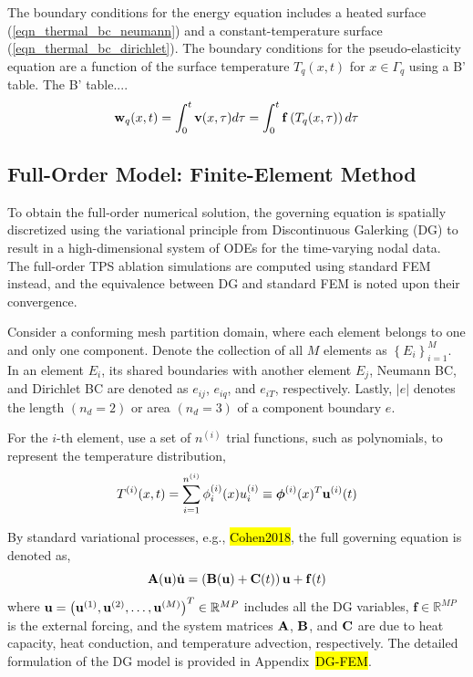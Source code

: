 The boundary conditions for the energy equation includes a heated surface (\cref{eqn_thermal_bc_neumann}) and a constant-temperature surface (\cref{eqn_thermal_bc_dirichlet}). The boundary conditions for the pseudo-elasticity equation are a function of the surface temperature $T_q(x,t)$ for $x\in\Gamma_q$ using a B' table. The B' table....
\begin{equation}
    \mathbf{w}_q(x,t) = \int_{0}^{t} \mathbf{v}(x,\tau)d\tau = \int_{0}^{t}\mathbf{f}\left(T_q(x,\tau)\right)d\tau\label{eqn_boundary_displacement}
\end{equation}


\subsection{Full-Order Model: Finite-Element Method}\label{sec_fom}

To obtain the full-order numerical solution, the governing equation is spatially discretized using the variational principle from Discontinuous Galerking (DG) to result in a high-dimensional system of ODEs for the time-varying nodal data. The full-order TPS ablation simulations are computed using standard FEM instead, and the equivalence between DG and standard FEM is noted upon their convergence.

Consider a conforming mesh partition domain, where each element belongs to one and only one component. Denote the collection of all $M$ elements as $\left\{E_i\right\}_{i=1}^{M}$. In an element $E_i$, its shared boundaries with another element $E_j$, Neumann BC, and Dirichlet BC are denoted as $e_{ij}$, $e_{iq}$, and $e_{iT}$, respectively. Lastly, $\left|e\right|$ denotes the length $(n_d=2)$ or area $(n_d=3)$ of a component boundary $e$.

For the $i$-th element, use a set of $n^{(i)}$ trial functions, such as polynomials, to represent the temperature distribution,
\begin{equation}
    T^{(i)}(x,t) = \sum_{i=1}^{n^{(i)}} \phi_i^{(i)}(x)u_i^{(i)} \equiv \boldsymbol{\phi}^{(i)}(x)^T\mathbf{u}^{(i)}(t)\label{eqn_element_temperature}
\end{equation}


By standard variational processes, e.g., \hl{Cohen2018}, the full governing equation is denoted as,
\begin{equation}
    \mathbf{A}(\mathbf{u})\dot{\mathbf{u}} = \left(\mathbf{B}(\mathbf{u}) + \mathbf{C}(t)\right)\mathbf{u} + \mathbf{f}(t)\label{eqn_energy_fem}
\end{equation}
where $\mathbf{u} = \left(\mathbf{u}^{(1)}, \mathbf{u}^{(2)}, \ldots, \mathbf{u}^{(M)}\right)^T\in\mathbb{R}^{MP}$ includes all the DG variables, $\mathbf{f}\in\mathbb{R}^{MP}$ is the external forcing, and the system matrices $\mathbf{A}$, $\mathbf{B}$, and $\mathbf{C}$ are due to heat capacity, heat conduction, and temperature advection, respectively. The detailed formulation of the DG model is provided in Appendix~\hl{DG-FEM}.

